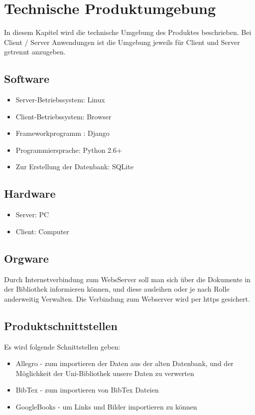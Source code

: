 
\chapter{Technische Produktumgebung}

In diesem Kapitel wird die technische Umgebung des Produktes beschrieben. Bei
Client / Server  Anwendungen ist die Umgebung jeweils für Client und Server
getrennt anzugeben.

\section{Software}
\begin{itemize}
\item Server-Betriebssystem:              Linux
\item Client-Betriebssystem:                Browser
\item Frameworkprogramm :                Django
\item Programmiersprache:                  Python 2.6+
\item Zur Erstellung der Datenbank:   SQLite
\end{itemize}



\section{Hardware}
\begin{itemize}
\item Server: PC
\item Client: Computer
\end{itemize}

\section{Orgware}

Durch Internetverbindung zum WebsServer soll man sich über die Dokumente in der Bibliothek informieren können, und 
diese ausleihen oder je nach Rolle anderweitig Verwalten. Die Verbindung zum Webserver wird per https  gesichert. 



\section{Produktschnittstellen}

Es wird folgende Schnittstellen geben:
\begin{itemize}
\item Allegro - zum importieren der Daten aus der alten Datenbank, und der Möglichkeit der Uni-Bibliothek unsere Daten zu verwerten
\item BibTex - zum importieren von BibTex Dateien
\item GoogleBooks - um Links und Bilder importieren zu können
\end{itemize}


